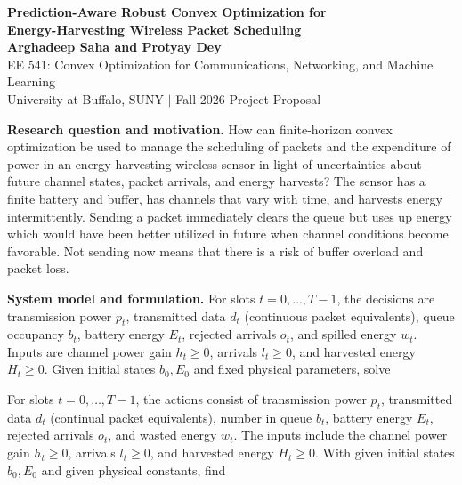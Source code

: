 \documentclass[10pt,letterpaper]{article}
\begin{document}
\begin{center}
{\large\bfseries Prediction-Aware Robust Convex Optimization for\\ Energy-Harvesting Wireless Packet Scheduling}\\[3pt]
{\bfseries Arghadeep Saha \quad and \quad Protyay Dey }\\[2pt]
{\small EE 541: Convex Optimization for Communications, Networking, and Machine Learning\\ University at Buffalo, SUNY \quad $\vert$ \quad Fall 2026 Project Proposal}
\end{center}
\vspace{-7pt}
\textbf{Research question and motivation.} How can finite-horizon convex optimization be used to manage the scheduling of packets and the expenditure of power in an energy harvesting wireless sensor in light of uncertainties about future channel states, packet arrivals, and energy harvests? The sensor has a finite battery and buffer, has channels that vary with time, and harvests energy intermittently. Sending a packet immediately clears the queue but uses up energy which would have been better utilized in future when channel conditions become favorable. Not sending now means that there is a risk of buffer overload and packet loss.

\textbf{System model and formulation.} For slots $t=0,\ldots,T-1$, the decisions are transmission power $p_t$, transmitted data $d_t$ (continuous packet equivalents), queue occupancy $b_t$, battery energy $E_t$, rejected arrivals $o_t$, and spilled energy $w_t$. Inputs are channel power gain $h_t\geq0$, arrivals $l_t\geq0$, and harvested energy $H_t\geq0$. Given initial states $b_0,E_0$ and fixed physical parameters, solve

For slots $t=0,\ldots,T-1$, the actions consist of transmission power $p_t$, transmitted data $d_t$ (continual packet equivalents), number in queue $b_t$, battery energy $E_t$, rejected arrivals $o_t$, and wasted energy $w_t$. The inputs include the channel power gain $h_t\geq0$, arrivals $l_t\geq0$, and harvested energy $H_t\geq0$. With given initial states $b_0,E_0$ and given physical constants, find
\end{document}
